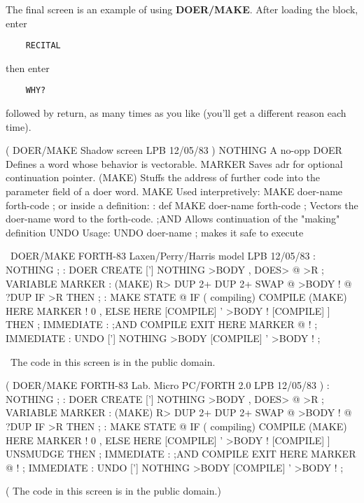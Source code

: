 The final screen is an example of using {\bf DOER/MAKE}.  After loading 
the block, enter
\begin{verbatim}
    RECITAL
\end{verbatim}
then enter 
\begin{verbatim}
    WHY?
\end{verbatim}
followed by return, as many times as you like (you'll get a different
reason each time).

\vfill
\setcounter{screen}{21}
\begin{Screen}
( DOER/MAKE   Shadow screen                      LPB 12/05/83 )
NOTHING   A no-opp
DOER      Defines a word whose behavior is vectorable.
MARKER    Saves adr for optional continuation pointer.
(MAKE)    Stuffs the address of further code into the
          parameter field of a doer word.
MAKE      Used interpretively:  MAKE doer-name  forth-code ;
          or inside a definition:
             : def   MAKE doer-name  forth-code ;
          Vectors the doer-name word to the forth-code.
;AND      Allows continuation of the "making" definition
UNDO      Usage:  UNDO doer-name ; makes it safe to execute




\end{Screen}
\vfill
\begin{Screen}
\ DOER/MAKE   FORTH-83 Laxen/Perry/Harris model  LPB 12/05/83 
: NOTHING ;
: DOER   CREATE  ['] NOTHING  >BODY ,  DOES> @ >R ;
VARIABLE MARKER
: (MAKE)  R>  DUP 2+  DUP 2+  SWAP @  >BODY !
   @ ?DUP IF >R THEN ;
: MAKE   STATE @ IF ( compiling)
   COMPILE (MAKE)  HERE MARKER !  0 ,
   ELSE  HERE  [COMPILE] '  >BODY !
   [COMPILE] ]  THEN ;   IMMEDIATE
: ;AND   COMPILE EXIT  HERE MARKER @ ! ;   IMMEDIATE
: UNDO   ['] NOTHING  >BODY  [COMPILE] '  >BODY ! ;

\ The code in this screen is in the public domain.


\end{Screen}
\vfill
\begin{Screen}
( DOER/MAKE   FORTH-83 Lab. Micro PC/FORTH 2.0   LPB 12/05/83 )
: NOTHING ;
: DOER   CREATE  ['] NOTHING  >BODY ,  DOES> @ >R ;
VARIABLE MARKER
: (MAKE)  R>  DUP 2+  DUP 2+  SWAP @  >BODY !
   @ ?DUP IF >R THEN ;
: MAKE   STATE @ IF ( compiling)
   COMPILE (MAKE)  HERE MARKER !  0 ,
   ELSE  HERE  [COMPILE] '  >BODY !
   [COMPILE] ] UNSMUDGE  THEN ;   IMMEDIATE
: ;AND   COMPILE EXIT  HERE MARKER @ ! ;   IMMEDIATE
: UNDO   ['] NOTHING  >BODY  [COMPILE] '  >BODY ! ;

( The code in this screen is in the public domain.)


\end{Screen}

